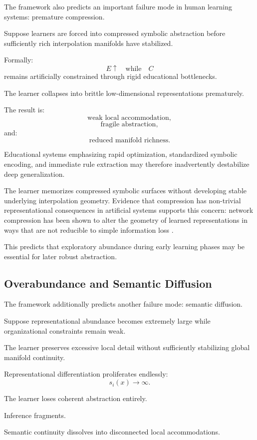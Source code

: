 \documentclass[12pt,a4paper]{article}
\begin{document}
The framework also predicts an important failure mode in human learning systems:
premature compression.

Suppose learners are forced into compressed symbolic abstraction before sufficiently rich interpolation manifolds have stabilized.

Formally:
\[
E
\uparrow
\quad
\text{while}
\quad
C
\]
remains artificially constrained through rigid educational bottlenecks.

The learner collapses into brittle low-dimensional representations prematurely.

The result is:
\[
\text{weak local accommodation},
\]
\[
\text{fragile abstraction},
\]
and:
\[
\text{reduced manifold richness}.
\]

Educational systems emphasizing rapid optimization, standardized symbolic encoding, and immediate rule extraction may therefore inadvertently destabilize deep generalization.

The learner memorizes compressed symbolic surfaces without developing stable underlying interpolation geometry. Evidence that compression has non-trivial representational consequences in artificial systems supports this concern: network compression has been shown to alter the geometry of learned representations in ways that are not reducible to simple information loss \cite{Frankland2021}.

This predicts that exploratory abundance during early learning phases may be essential for later robust abstraction.

\subsection{Overabundance and Semantic Diffusion}

The framework additionally predicts another failure mode:
semantic diffusion.

Suppose representational abundance becomes extremely large while organizational constraints remain weak.

The learner preserves excessive local detail without sufficiently stabilizing global manifold continuity.

Representational differentiation proliferates endlessly:
\[
s_i(x)
\rightarrow
\infty.
\]

The learner loses coherent abstraction entirely.

Inference fragments.

Semantic continuity dissolves into disconnected local accommodations.
\end{document}

